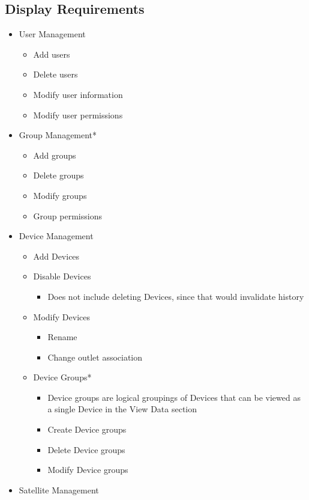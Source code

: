 \subsection{Display Requirements}
\begin{itemize}
 \item User Management
	\begin{itemize}
	 \item Add users
	 \item Delete users
	 \item Modify user information
	 \item Modify user permissions
	\end{itemize}
 \item Group Management*
	\begin{itemize}
	 \item Add groups
	 \item Delete groups
	 \item Modify groups
	 \item Group permissions
	\end{itemize}
 \item Device Management
	\begin{itemize}
	 \item Add Devices
	 \item Disable Devices
		\begin{itemize}
	 		\item Does not include deleting Devices, since that would invalidate history
		\end{itemize}
	 \item Modify Devices
		\begin{itemize}
	 		\item Rename
	 		\item Change outlet association
		\end{itemize}
	 \item Device Groups*
		\begin{itemize}
		 \item Device groups are logical groupings of Devices that can be 
		 	viewed as a single Device in the View Data section
		 \item Create Device groups
		 \item Delete Device groups
		 \item Modify Device groups
		\end{itemize}
	\end{itemize}
 \item Satellite Management
	\begin{itemize}

\end{itemize}
\end{itemize}
